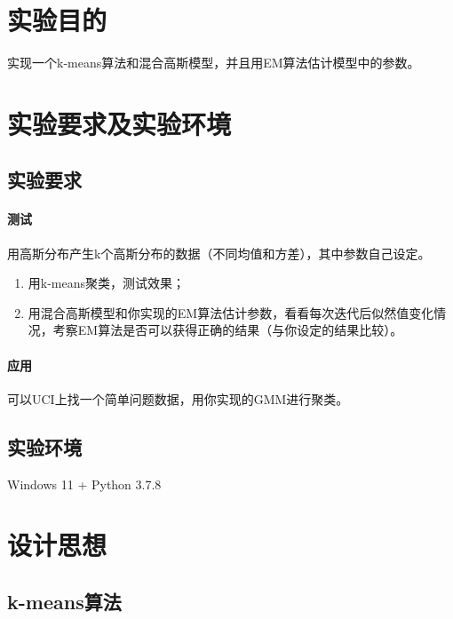 \documentclass[lang=cn,11pt,a4paper,cite=authoryear]{elegantpaper}
\begin{document}
 
\newpage

\section{实验目的}

实现一个k-means算法和混合高斯模型，并且用EM算法估计模型中的参数。

\section{实验要求及实验环境}

\subsection{实验要求}

\paragraph{测试}

用高斯分布产生k个高斯分布的数据（不同均值和方差），其中参数自己设定。

\begin{enumerate}
	\item 用k-means聚类，测试效果；
	\item 用混合高斯模型和你实现的EM算法估计参数，看看每次迭代后似然值变化情况，考察EM算法是否可以获得正确的结果（与你设定的结果比较）。
\end{enumerate}

\paragraph{应用}

可以UCI上找一个简单问题数据，用你实现的GMM进行聚类。

\subsection{实验环境}

Windows 11 + Python 3.7.8

\section{设计思想}

\subsection{k-means算法}
\end{document}

